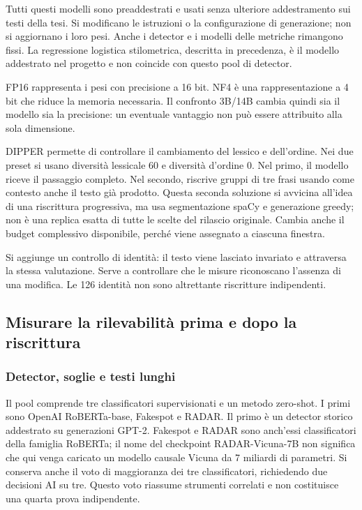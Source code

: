 Tutti questi modelli sono preaddestrati e usati senza ulteriore addestramento sui testi della tesi. Si modificano le istruzioni o la configurazione di generazione; non si aggiornano i loro pesi. Anche i detector e i modelli delle metriche rimangono fissi. La regressione logistica stilometrica, descritta in precedenza, è il modello addestrato nel progetto e non coincide con questo pool di detector.

FP16 rappresenta i pesi con precisione a 16 bit. NF4 è una rappresentazione a 4 bit che riduce la memoria necessaria. Il confronto 3B/14B cambia quindi sia il modello sia la precisione: un eventuale vantaggio non può essere attribuito alla sola dimensione.

DIPPER permette di controllare il cambiamento del lessico e dell'ordine. Nei due preset si usano diversità lessicale 60 e diversità d'ordine 0. Nel primo, il modello riceve il passaggio completo. Nel secondo, riscrive gruppi di tre frasi usando come contesto anche il testo già prodotto. Questa seconda soluzione si avvicina all'idea di una riscrittura progressiva, ma usa segmentazione spaCy e generazione greedy; non è una replica esatta di tutte le scelte del rilascio originale. Cambia anche il budget complessivo disponibile, perché viene assegnato a ciascuna finestra.

Si aggiunge un controllo di identità: il testo viene lasciato invariato e attraversa la stessa valutazione. Serve a controllare che le misure riconoscano l'assenza di una modifica. Le 126 identità non sono altrettante riscritture indipendenti.

\subsection{Misurare la rilevabilità prima e dopo la riscrittura}\label{misurare-la-rilevabilituxe0-prima-e-dopo-la-riscrittura}

\subsubsection{Detector, soglie e testi lunghi}\label{detector-soglie-e-testi-lunghi}

Il pool comprende tre classificatori supervisionati e un metodo zero-shot. I primi sono OpenAI RoBERTa-base, Fakespot e RADAR. Il primo è un detector storico addestrato su generazioni GPT-2. Fakespot e RADAR sono anch'essi classificatori della famiglia RoBERTa; il nome del checkpoint RADAR-Vicuna-7B non significa che qui venga caricato un modello causale Vicuna da 7 miliardi di parametri. Si conserva anche il voto di maggioranza dei tre classificatori, richiedendo due decisioni AI su tre. Questo voto riassume strumenti correlati e non costituisce una quarta prova indipendente.

